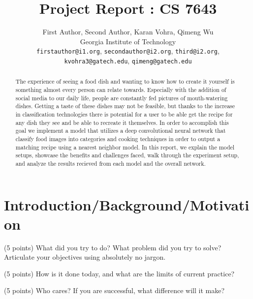 \documentclass[10pt,twocolumn,letterpaper]{article}
\begin{document}
\title{Project Report : CS 7643}

\author{First Author, Second Author, Karan Vohra, Qimeng Wu\\
Georgia Institute of Technology\\
{\tt\small firstauthor@i1.org}, {\tt\small secondauthor@i2.org}, {\tt\small third@i2.org}, {\tt\small kvohra3@gatech.edu}, {\tt\small  qimeng@gatech.edu}
}
\maketitle

\begin{abstract}
   The experience of seeing a food dish and wanting to know how to create it yourself is something almost every person can relate towards. Especially with the addition of social media to our daily life, people are constantly fed pictures of mouth-watering dishes. Getting a taste of these dishes may not be feasible, but thanks to the increase in classification technologies there is potential for a user to be able get the recipe for any dish they see and be able to recreate it themselves. In order to accomplish this goal we implement a model that utilizes a deep convolutional neural network that classify food images into categories and cooking techniques in order to output a matching recipe using a nearest neighbor model. In this report, we explain the model setups, showcase the benefits and challenges faced, walk through the experiment setup, and analyze the results recieved from each model and the overall network. 
\end{abstract}

\section{Introduction/Background/Motivation}

(5 points) What did you try to do? What problem did you try to solve? Articulate your objectives using absolutely no jargon. 

(5 points) How is it done today, and what are the limits of current practice?

(5 points) Who cares? If you are successful, what difference will it make? 
\end{document}
